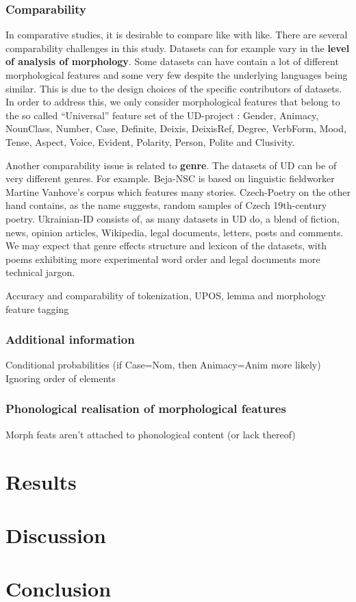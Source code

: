 \documentclass[a4paper]{article}
\begin{document}
\subsubsection{Comparability}
In comparative studies, it is desirable to compare like with like. There are several comparability challenges in this study. 
Datasets can for example vary in the \textbf{level of analysis of morphology}. 
Some datasets can have contain a lot of different morphological features and some very few despite the underlying languages being similar. 
This is due to the design choices of the specific contributors of datasets. 
In order to address this, we only consider morphological features that belong to the so called ``Universal'' feature set of the UD-project \citep{ud_2_feat_website}: Gender, Animacy, NounClass, Number, Case, Definite, Deixis, DeixisRef, Degree, VerbForm, Mood, Tense, Aspect, Voice, Evident, Polarity, Person, Polite and Clusivity.

Another comparability issue is related to \textbf{genre}. The datasets of UD can be of very different genres. For example. Beja-NSC is based on linguistic fieldworker Martine Vanhove's corpus which features many stories. Czech-Poetry on the other hand contains, as the name suggests, random samples of Czech 19th-century poetry. Ukrainian-ID consists of, as many datasets in UD do, a blend of fiction, news, opinion articles, Wikipedia, legal documents, letters, posts and comments. We may expect that genre effects structure and lexicon of the datasets, with poems exhibiting more experimental word order and legal documents more technical jargon. 



Accuracy and comparability of tokenization, UPOS, lemma and morphology feature tagging

\subsubsection{Additional information}
Conditional probabilities (if Case=Nom, then Animacy=Anim more likely)
Ignoring order of elements

\subsubsection{Phonological realisation of morphological features}
Morph feats aren't attached to phonological content (or lack thereof)




\section{Results}

\section{Discussion}

\section{Conclusion}





	
\end{document}
